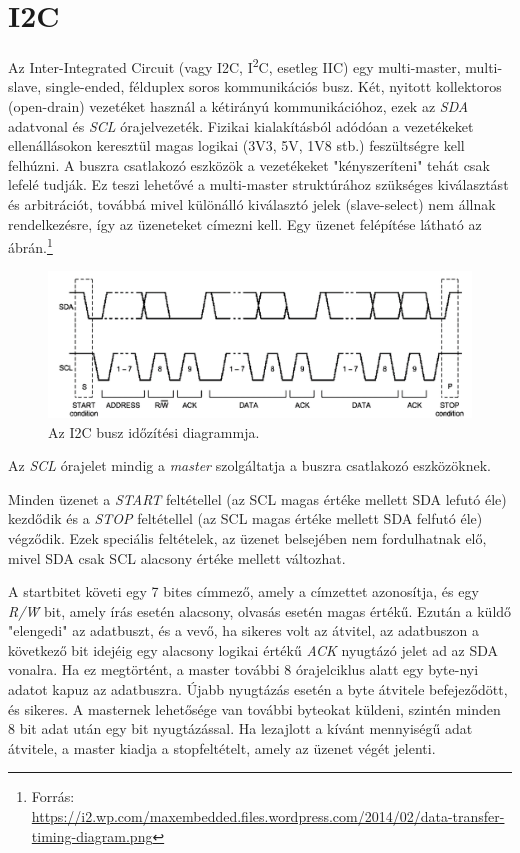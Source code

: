 \section{I2C} {
    Az Inter-Integrated Circuit (vagy I2C, I\textsuperscript{2}C, esetleg IIC) egy multi-master, multi-slave, single-ended, félduplex soros kommunikációs busz.\cite{I2C}
    Két, nyitott kollektoros (open-drain) vezetéket használ a kétirányú kommunikációhoz, ezek az \emph{SDA} adatvonal és \emph{SCL} órajelvezeték. Fizikai kialakításból adódóan a vezetékeket ellenállásokon keresztül magas logikai (3V3, 5V, 1V8 stb.) feszültségre kell felhúzni. A buszra csatlakozó eszközök a vezetékeket "kényszeríteni" tehát csak lefelé tudják. Ez teszi lehetővé a multi-master struktúrához szükséges kiválasztást és arbitrációt, továbbá mivel különálló kiválasztó jelek (slave-select) nem állnak rendelkezésre, így az üzeneteket címezni kell. Egy üzenet felépítése látható az  ábrán.\footnote{Forrás: \tiny\\\url{https://i2.wp.com/maxembedded.files.wordpress.com/2014/02/data-transfer-timing-diagram.png}}

    \begin{figure}[ht!]
        \includegraphics[width = \textwidth]{figures/i2ctiming}
        \caption{Az I2C busz időzítési diagrammja.}
        \label{fig:I2Cmessage}
    \end{figure}

    Az \emph{SCL} órajelet mindig a \emph{master} szolgáltatja a buszra csatlakozó eszközöknek.

    Minden üzenet a \emph{START} feltétellel (az SCL magas értéke mellett SDA lefutó éle) kezdődik és a \emph{STOP} feltétellel (az SCL magas értéke mellett SDA felfutó éle) végződik. Ezek speciális feltételek, az üzenet belsejében nem fordulhatnak elő, mivel SDA csak SCL alacsony értéke mellett változhat.

    A startbitet követi egy 7 bites címmező, amely a címzettet azonosítja, és egy \emph{R/\={W}} bit, amely írás esetén alacsony, olvasás esetén magas értékű. Ezután a küldő "elengedi" az adatbuszt, és a vevő, ha sikeres volt az átvitel, az adatbuszon a következő bit idejéig egy alacsony logikai értékű \emph{ACK} nyugtázó jelet ad az SDA vonalra. Ha ez megtörtént, a master további 8 órajelciklus alatt egy byte-nyi adatot kapuz az adatbuszra. Újabb nyugtázás esetén a byte átvitele befejeződött, és sikeres. A masternek lehetősége van további byteokat küldeni, szintén minden 8 bit adat után egy bit nyugtázással. Ha lezajlott a kívánt mennyiségű adat átvitele, a master kiadja a stopfeltételt, amely az üzenet végét jelenti.
}
